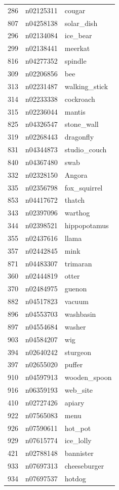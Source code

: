 \begin{table}
\begin{tabular}{cll}
286 & n02125311 & cougar \\
807 & n04258138 & solar_dish \\
296 & n02134084 & ice_bear \\
299 & n02138441 & meerkat \\
816 & n04277352 & spindle \\
309 & n02206856 & bee \\
313 & n02231487 & walking_stick \\
314 & n02233338 & cockroach \\
315 & n02236044 & mantis \\
825 & n04326547 & stone_wall \\
319 & n02268443 & dragonfly \\
831 & n04344873 & studio_couch \\
840 & n04367480 & swab \\
332 & n02328150 & Angora \\
335 & n02356798 & fox_squirrel \\
853 & n04417672 & thatch \\
343 & n02397096 & warthog \\
344 & n02398521 & hippopotamus \\
355 & n02437616 & llama \\
357 & n02442845 & mink \\
871 & n04483307 & trimaran \\
360 & n02444819 & otter \\
370 & n02484975 & guenon \\
882 & n04517823 & vacuum \\
896 & n04553703 & washbasin \\
897 & n04554684 & washer \\
903 & n04584207 & wig \\
394 & n02640242 & sturgeon \\
397 & n02655020 & puffer \\
910 & n04597913 & wooden_spoon \\
916 & n06359193 & web_site \\
410 & n02727426 & apiary \\
922 & n07565083 & menu \\
926 & n07590611 & hot_pot \\
929 & n07615774 & ice_lolly \\
421 & n02788148 & bannister \\
933 & n07697313 & cheeseburger \\
934 & n07697537 & hotdog \\

\end{tabular}
\end{table}
